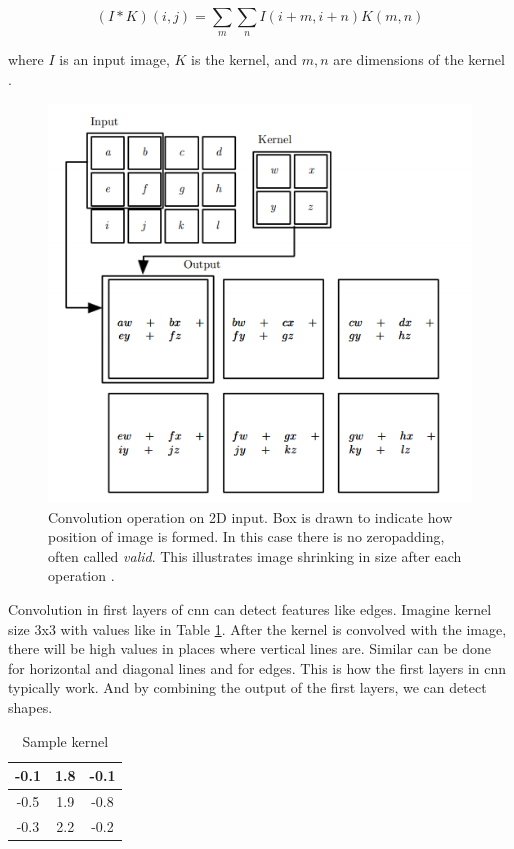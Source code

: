 \documentclass[thesis=B,english]{FITthesis}[2019/12/23]
\begin{document}
    $$ (I * K)(i, j) = \sum_{m}\sum_{n} I(i+m, i+n)K(m, n) $$
    
    where $I$ is an input image, $K$ is the kernel, and $m, n$ are dimensions of the kernel \cite{bengio2017deep}. 
    
    \begin{figure}
        \centering
        \includegraphics[width=\textwidth]{Convolution_operation.PNG}
        \caption[Convolution operation on 2D input]{Convolution operation on 2D input. Box is drawn to indicate how position of image is formed. In this case there is no zeropadding, often called \emph{valid}. This illustrates image shrinking in size after each operation \cite{bengio2017deep}.}
        \label{fig:conv_operation}
    \end{figure}
    
    Convolution in first layers of \gls{cnn} can detect features like edges. Imagine kernel size 3x3 with values like in Table \ref{tab:sample_kernel}. After the kernel is convolved with the image, there will be high values in places where vertical lines are. Similar can be done for horizontal and diagonal lines and for edges. This is how the first layers in \gls{cnn} typically work. And by combining the output of the first layers, we can detect shapes.

    \begin{table}[ht!]
        \centering
        \begin{tabular}{|c|c|c|}\hline
            -0.1    & 1.8     & -0.1\\\hline
            -0.5    & 1.9     & -0.8\\\hline
            -0.3    & 2.2     & -0.2\\\hline
        \end{tabular}
        \caption{Sample kernel}
        \label{tab:sample_kernel}
    \end{table}
    
\end{document}
